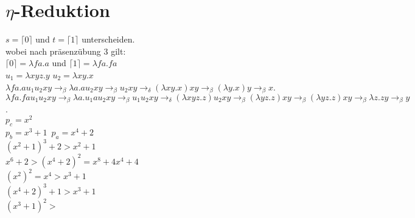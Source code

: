 \documentclass{article}
\begin{document}
	\section{$\eta$-Reduktion}
	$s=\lceil 0\rceil$ und $t=\lceil 1\rceil$ unterscheiden.\\
	wobei nach präsenzübung 3 gilt:\\
	$\lceil 0\rceil=\lambda fa.a$ und $\lceil 1\rceil=\lambda fa.fa$\\
	$u_1 = \lambda xyz.y$ $u_2 = \lambda xy.x$\\
	$\lambda fa.a u_1 u_2 x y \to_\beta \lambda a.a u_2 x y\to_\beta u_2xy\to_\delta (\lambda xy.x)xy\to_\beta (\lambda y.x)y\to_\beta x$.\\
	$\lambda fa.fa u_1 u_2 x y\to_\beta \lambda a.u_1 a u_2 xy\to_\beta u_1u_2 xy\to_\delta (\lambda xyz.z) u_2 xy\to_\beta (\lambda yz.z) xy\to_\beta (\lambda yz.z) x y\to_\beta \lambda z.zy\to_\beta y$.\\

	$p_c = x^2$\\
	$p_b = x^3+1$\
	$p_a = x^4+2$\\

	$(x^2+1)^3 +2 > x^2+1$\\
	$x^6+2 > (x^4+2)^2 = x^8+4x^4+4$\\
	$(x^2)^2= x^4 > x^3+1$\\
	$(x^4+2)^3+1 >x^3+1$\\
	$(x^3+1)^2 > $
\end{document}
